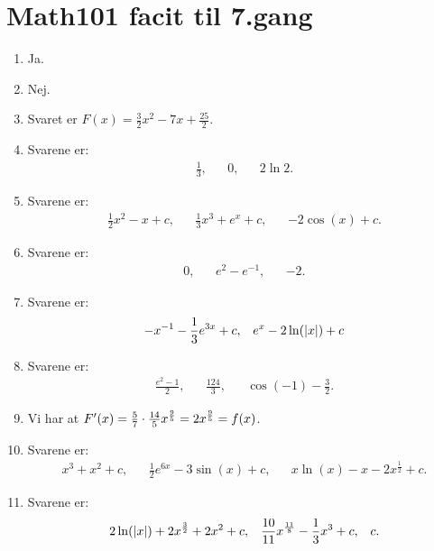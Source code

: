 \newpage
\section{Math101 facit til 7.gang}

\begin{enumerate}
	\item Ja.
	
	
	\item Nej.
	
	\item Svaret er $F(x)=\frac{3}{2}x^2-7x+\frac{25}{2}$.
	
	\item Svarene er:
	\begin{align*}
	\frac{1}{3},&& 0, && 2\ln 2. 
	\end{align*}
		
	
	\item Svarene er:
	\begin{align*}
	\frac{1}{2}x^2-x+c, && \frac{1}{3}x^3+e^x+c,&& -2\cos(x)+c.
	\end{align*}
	
	\item Svarene er:
	\begin{align*}
	0,&& e^2-e^{-1}, && -2.
	\end{align*}
	
	\item Svarene er:
	\begin{align*}
	-x^{-1}-\frac{1}{3}e^{3x}+c ,&& e^{x}-2\ln(\vert x\vert)+c
	\end{align*}
	
	
	\item Svarene er:
	\begin{align*}
	\frac{e^2-1}{2},&&   \frac{124}{3},&& \cos(-1)-\frac{3}{2}.
	\end{align*}
	
	
	
	
	
	\item Vi har at $F'(x)=\frac{5}{7}\cdot\frac{14}{5}x^{\frac{9}{5}}=2x^{\frac{9}{5}}=f(x)$.
	
	\item Svarene er:
	\begin{align*}
	x^3+x^2+c,&& \frac{1}{2}e^{6x}-3\sin(x)+c,&& x\ln(x)-x-2x^{\frac{1}{2}}+c.
	\end{align*}
	

	
	\item Svarene er:
	\begin{align*}
	2\ln(\vert x\vert)+2x^{\frac{3}{2}}+2x^2+c,&& \frac{10}{11}x^{\frac{11}{8}}-\frac{1}{3}x^3+c,&& c.
	\end{align*}
	

\end{enumerate}
